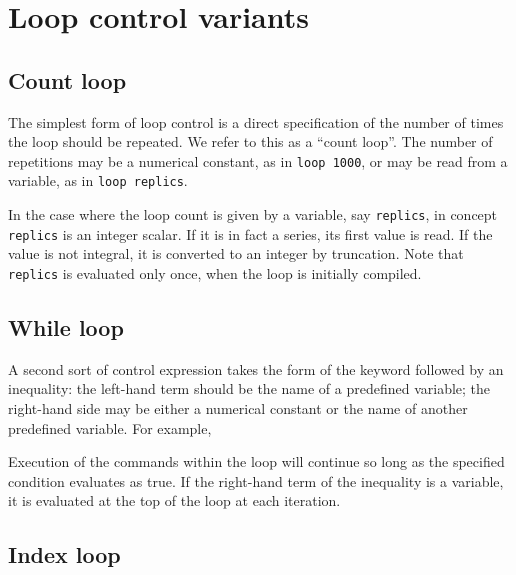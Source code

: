 
\section{Loop control variants}
\label{loop-control}

\subsection{Count loop}
\label{loop-count}

The simplest form of loop control is a direct specification of the
number of times the loop should be repeated.  We refer to this as a
``count loop''.  The number of repetitions may be a numerical
constant, as in \verb+loop 1000+, or may be read from a variable, as
in \verb+loop replics+.

In the case where the loop count is given by a variable, say
\verb+replics+, in concept \verb+replics+ is an integer scalar.  If it
is in fact a series, its first value is read.  If the value is not
integral, it is converted to an integer by truncation.  Note that
\verb+replics+ is evaluated only once, when the loop is initially
compiled.
      

\subsection{While loop}
\label{loop-while}

A second sort of control expression takes the form of the keyword
 followed by an inequality: the left-hand term should be
the name of a predefined variable; the right-hand side may be either a
numerical constant or the name of another predefined variable.  For
example, 


Execution of the commands within the loop will continue so long as the
specified condition evaluates as true. If the right-hand term of the
inequality is a variable, it is evaluated at the top of the loop at
each iteration.

\subsection{Index loop}
\label{loop-index}

